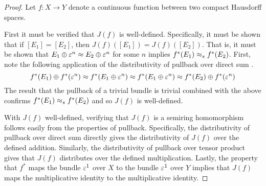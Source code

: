 \documentclass[../../sean_thesis.tex]{subfiles}
\begin{document}
\begin{proof}
	Let $f: X \to Y$ denote a continuous function between two compact Hausdorff spaces.

First it must be verified that $J(f)$ is well-defined. Specifically, it must be shown that if $[E_1] = [E_2]$, then $J(f)([E_1]) = J(f)([E_2])$. That is, it must be shown that $E_1 \oplus \varepsilon^{n} \approx E_2 \oplus \varepsilon^{n}$ for some $n$ implies $f^{*}(E_1) \approx_s f^{*}(E_2)$. First, note the following application of the distributivity of pullback over direct sum .
\begin{equation*}
	f^{*}(E_1) \oplus f^{*}(\varepsilon^{n})
	\approx  f^{*}(E_1 \oplus \varepsilon^{n})
	\approx f^{*}(E_1 \oplus \varepsilon^{n})
	\approx f^{*}(E_2) \oplus f^{*}(\varepsilon^{n})
\end{equation*}
The result that the pullback of a trivial bundle is trivial combined with the above confirms $f^{*}(E_1) \approx_s f^{*}(E_2)$ and so $J(f)$ is well-defined.
	
With $J(f)$ well-defined, verifying that $J(f)$ is a semiring homomorphism follows easily from the properties of pullback. Specifically, the distributivity of pullback over direct sum directly gives the distributivity of $J(f)$ over the defined addition. Similarly, the distributivity of pullback over tensor product gives that $J(f)$ distributes over the defined multiplication. Lastly, the property that $f^{*}$ maps the bundle $\varepsilon^{1}$ over $X$ to the bundle $\varepsilon^{1}$ over $Y$ implies that $J(f)$ maps the multiplicative identity to the multiplicative identity. 
\end{proof}
\end{document}
